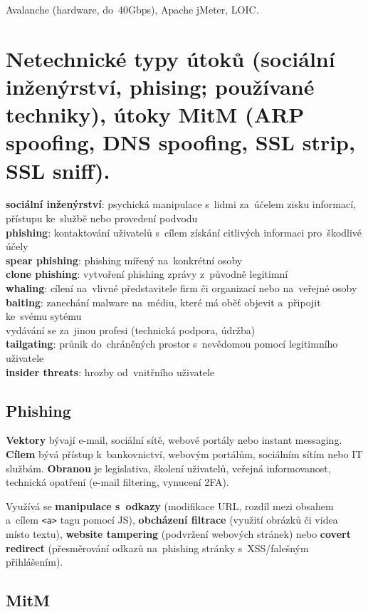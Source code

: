 Avalanche (hardware, do~40Gbps), Apache jMeter, LOIC.

\clearpage
\section{Netechnické typy útoků (sociální inženýrství, phising; používané techniky), útoky MitM (ARP spoofing, DNS spoofing, SSL strip, SSL sniff).}

\textbf{sociální inženýrství}: psychická manipulace s~lidmi za~účelem zisku informací, přístupu ke~službě nebo provedení podvodu \\
\textbf{phishing}: kontaktování uživatelů s~cílem získání citlivých informaci pro~škodlivé účely \\
\textbf{spear phishing}: phishing mířený na~konkrétní osoby \\
\textbf{clone phishing}: vytvoření phishing zprávy z~původně legitimní \\
\textbf{whaling}: cílení na~vlivné představitele firm či organizací nebo na~veřejné osoby \\
\textbf{baiting}: zanechání malware na~médiu, které má oběť objevit a~připojit ke~svému sytému \\
vydávání se za~jinou profesi (technická podpora, údržba) \\
\textbf{tailgating}: průnik do~chráněných prostor s~nevědomou pomocí legitimního uživatele \\
\textbf{insider threats}: hrozby od~vnitřního uživatele

\subsection*{Phishing}

\textbf{Vektory} bývají e-mail, sociální sítě, webové portály nebo instant messaging. \textbf{Cílem} bývá přístup k~bankovnictví, webovým portálům, sociálním sítím nebo IT službám. \textbf{Obranou} je legislativa, školení uživatelů, veřejná informovanost, technická opatření (e-mail filtering, vynucení 2FA).

Využívá se \textbf{manipulace s~odkazy} (modifikace URL, rozdíl mezi obsahem a~cílem \texttt{<a>} tagu pomocí JS), \textbf{obcházení filtrace} (využití obrázků či videa místo textu), \textbf{website tampering} (podvržení webových stránek) nebo \textbf{covert redirect} (přesměrování odkazů na~phishing stránky s~XSS/falešným přihlášením).

\subsection{MitM}

